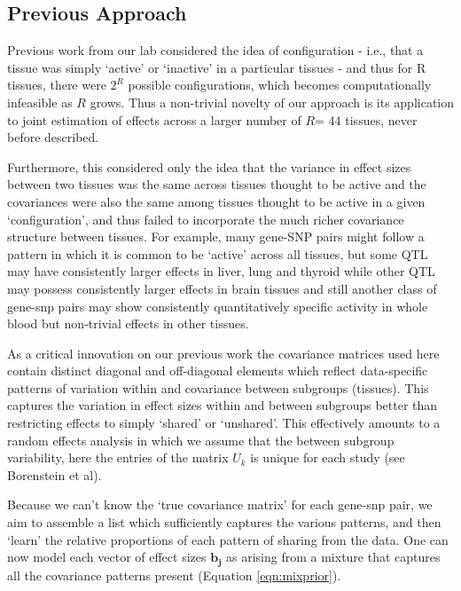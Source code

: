 \subsection{Previous Approach}
 
Previous work from our lab considered the idea of configuration - i.e., that a tissue was simply `active' or `inactive' in a particular tissues - and thus for R tissues, there were $2^{R}$ possible configurations, which becomes computationally infeasible as $R$ grows. Thus a non-trivial novelty of our approach is its application to joint estimation of effects across a larger number of $R$= 44 tissues, never before described.

Furthermore, this considered only the idea that the variance in effect sizes between two tissues was the same across tissues thought to be active and the covariances were also the same among tissues thought to be active in a given `configuration',  and thus failed to incorporate the much richer covariance structure between tissues. For example, many gene-SNP pairs might follow a pattern in which it is common to be `active' across all tissues, but some QTL may have consistently larger effects in liver, lung and thyroid while other QTL may possess consistently larger effects in brain tissues and still another class of gene-snp pairs may show consistently quantitatively specific activity in whole blood but non-trivial effects in other tissues. 

As a critical innovation on our previous work \cite{flutre_statistical_2013,wen_bayesian_2014} the covariance matrices used here contain distinct diagonal and off-diagonal elements which reflect data-specific patterns of variation within and covariance between subgroups (tissues). This captures the variation in effect sizes within and between subgroups better than restricting effects to simply `shared' or `unshared'. This effectively amounts to a random effects analysis in which we assume that the between subgroup variability, here the entries of the matrix $U_{k}$ is unique for each study (see Borenstein et al).

Because we can't know the `true covariance matrix' for each gene-snp pair, we aim to assemble a list which sufficiently captures the various patterns, and then `learn' the relative proportions of each pattern of sharing from the data. One can now model each vector of effect sizes $\bm{b_{j}}$ as arising from a mixture that captures all the covariance patterns present (Equation \ref{eqn:mixprior}).

